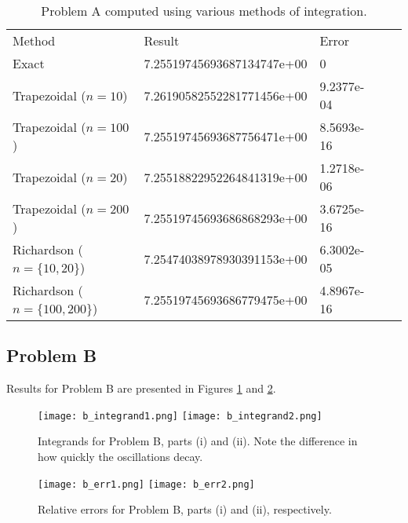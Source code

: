 \documentclass[12pt]{article}
\begin{document}
\begin{table}[h]
\centering
\begin{tabular}{lllll}
Method                 & Result                     & Error      &  &  \\ \cline{1-3}
Exact                  & 7.25519745693687134747e+00 & 0          &  &  \\
Trapezoidal ($n=10$)     & 7.26190582552281771456e+00 & 9.2377e-04 &  &  \\
Trapezoidal ($n=100$)    & 7.25519745693687756471e+00 & 8.5693e-16 &  &  \\
Trapezoidal ($n=20$)     & 7.25518822952264841319e+00 & 1.2718e-06 &  &  \\
Trapezoidal ($n=200$)    & 7.25519745693686868293e+00 & 3.6725e-16 &  &  \\
Richardson ($n=\{10,20\}$)   & 7.25474038978930391153e+00 & 6.3002e-05 &  &  \\
Richardson ($n=\{100,200\}$) & 7.25519745693686779475e+00 & 4.8967e-16 &  & 
\end{tabular}
\vspace{6pt}
\caption{Problem A computed using various methods of integration.}
\label{t:a}
\end{table}

\subsection{Problem B}

Results for Problem B are presented in Figures \ref{fig:b_integrands} and \ref{fig:b_errs}.

\begin{figure}[h!]
\begin{center}
\texttt{[image: b\_integrand1.png]}
\texttt{[image: b\_integrand2.png]}
\\[6pt]
\caption{Integrands for Problem B, parts (i) and (ii). Note the difference in how quickly the oscillations decay.}
\label{fig:b_integrands}
\end{center}
\end{figure}

\begin{figure}[h!]
\begin{center}
\texttt{[image: b\_err1.png]}
\texttt{[image: b\_err2.png]}
\\[6pt]
\caption{Relative errors for Problem B, parts (i) and (ii), respectively.}
\label{fig:b_errs}
\end{center}
\end{figure}
\end{document}
